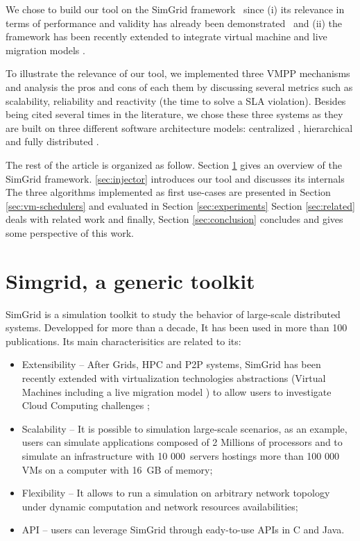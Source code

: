 \documentclass[conference]{IEEEtran}
\newcommand{\sg}{SimGrid\xspace}
\begin{document}
%
We chose to build our tool on the \sg
framework~\cite{casanova:hal-01017319} since (i) its relevance in
terms of performance and validity has already been
demonstrated~\cite{simgridpub} and (ii) the framework has been
recently extended to integrate virtual machine and live migration
models \cite{Hirofuchi:2013:ALM:2568486.2568524}.

To illustrate the relevance of our tool, we implemented three VMPP
mechanisms \cite{Hermenier:2009:ECM:1508293.1508300}
\cite{feller:ccgrid12} \cite{quesnel:cpe2012} and analysis the pros
and cons of each them by discussing several metrics such as
scalability, reliability and reactivity (\ie the time to solve a SLA
violation). Besides being cited several times in the literature, we
chose these three systems as they are built on three different
software architecture models: centralized
\cite{Hermenier:2009:ECM:1508293.1508300}, hierarchical
\cite{feller:ccgrid12} and fully distributed \cite{quesnel:cpe2012}.

The rest of the article is organized as follow. Section \ref{sec:sg}
gives an overview of the \sg framework.
\ref{sec:injector} introduces our tool and discusses its internals
The three algorithms implemented as first use-cases are presented in
Section \ref{sec:vm-schedulers} and evaluated in Section \ref{sec:experiments}
Section \ref{sec:related} deals with related work and
finally, Section \ref{sec:conclusion} concludes and gives some perspective of this
work.

\section{Simgrid, a generic toolkit}
\label{sec:sg}

\sg is a simulation toolkit to study the behavior of
large-scale distributed systems.  Developped for more than  a decade, It has been used in more than 100
publications.  Its main characterisitics are related to its:
\begin{itemize}
\item Extensibility -- After Grids, HPC and P2P
  systems, \sg has been recently extended with virtualization technologies abstractions
(\ie Virtual Machines including a live migration model \cite{Hirofuchi:2013:ALM:2568486.2568524}) to allow users to investigate Cloud
Computing challenges \cite{lucas:cloud2014};
\item Scalability -- It is possible to simulation large-scale scenarios,
  as an example, users can simulate applications composed of 2
  Millions of processors and to
  simulate an infrastructure with 10 000~servers hostings more than
  100 000 VMs on a computer with 16~GB of memory;
\item  Flexibility -- It allows to run a simulation on arbitrary network
  topology under dynamic computation and network resources
  availabilities;
\item API --  users can leverage \sg through eady-to-use APIs in C
  and Java.
\end{itemize}
\end{document}
